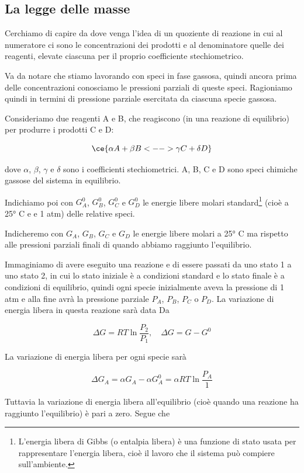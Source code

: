 \subsection{La legge delle masse}
Cerchiamo di capire da dove venga l'idea di un quoziente di reazione in cui al numeratore ci sono le concentrazioni dei prodotti e al denominatore quelle dei reagenti, elevate ciascuna per il proprio coefficiente stechiometrico.

Va da notare che stiamo lavorando con speci in fase gassosa, quindi ancora prima delle concentrazioni conosciamo le pressioni parziali di queste speci. Ragioniamo quindi in termini di pressione parziale esercitata da ciascuna specie gassosa.

Consideriamo due reagenti A e B, che reagiscono (in una reazione di equilibrio) per produrre i prodotti C e D:

$$\ce{\alpha A + \beta B <--> \gamma C + \delta D}$$

dove $\alpha$, $\beta$, $\gamma$ e $\delta$ sono i coefficienti stechiometrici. A, B, C e D sono speci chimiche gassose del sistema in equilibrio.

Indichiamo poi con $G_A^0$, $G_B^0$, $G_C^0$ e $G_D^0$ le energie libere molari standard\footnote{L'energia libera di Gibbs (o entalpia libera) è una funzione di stato usata per rappresentare l'energia libera, cioè il lavoro che il sistema può compiere sull'ambiente.} (cioè a 25° C e e 1 atm) delle relative speci.

Indicheremo con $G_A$, $G_B$, $G_C$ e $G_D$ le energie libere molari a 25° C ma rispetto alle pressioni parziali finali di quando abbiamo raggiunto l'equilibrio.

Immaginiamo di avere eseguito una reazione e di essere passati da uno stato 1 a uno stato 2, in cui lo stato iniziale è a condizioni standard e lo stato finale è a condizioni di equilibrio, quindi ogni specie inizialmente aveva la pressione di 1 atm e alla fine avrà la pressione parziale $P_A$, $P_B$, $P_C$ o $P_D$. La variazione di energia libera in questa reazione sarà data Da

$$\Delta G = RT \ln \frac{P_2}{P_1}, \quad \Delta G = G - G^0$$

La variazione di energia libera per ogni specie sarà

$$\Delta G_A = \alpha G_A - \alpha G_A^0 = \alpha RT \ln \frac{P_A}{1}$$

Tuttavia la variazione di energia libera all'equilibrio (cioè quando una reazione ha raggiunto l'equilibrio) è pari a zero. Segue che

